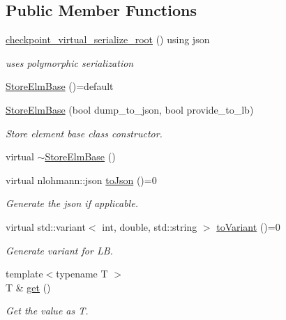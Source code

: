 \subsection*{Public Member Functions}
\begin{DoxyCompactItemize}
\item 
\hyperlink{structvt_1_1vrt_1_1collection_1_1storage_1_1_store_elm_base_ace4bb0073e5de18f3743ca10c31fdf2d}{checkpoint\+\_\+virtual\+\_\+serialize\+\_\+root} () using json
\begin{DoxyCompactList}\small\item\em uses polymorphic serialization \end{DoxyCompactList}\item 
\hyperlink{structvt_1_1vrt_1_1collection_1_1storage_1_1_store_elm_base_a7fa798418159b33d18f1b4a687c727c1}{Store\+Elm\+Base} ()=default
\item 
\hyperlink{structvt_1_1vrt_1_1collection_1_1storage_1_1_store_elm_base_a8deb42154070f2636df8f6fecdd6430c}{Store\+Elm\+Base} (bool dump\+\_\+to\+\_\+json, bool provide\+\_\+to\+\_\+lb)
\begin{DoxyCompactList}\small\item\em Store element base class constructor. \end{DoxyCompactList}\item 
virtual \hyperlink{structvt_1_1vrt_1_1collection_1_1storage_1_1_store_elm_base_a564f20122fff98f72f65752ce610f05e}{$\sim$\+Store\+Elm\+Base} ()
\item 
virtual nlohmann\+::json \hyperlink{structvt_1_1vrt_1_1collection_1_1storage_1_1_store_elm_base_a3c207bb3612dba2db9fef7e0e7f2e717}{to\+Json} ()=0
\begin{DoxyCompactList}\small\item\em Generate the json if applicable. \end{DoxyCompactList}\item 
virtual std\+::variant$<$ int, double, std\+::string $>$ \hyperlink{structvt_1_1vrt_1_1collection_1_1storage_1_1_store_elm_base_a1cfa9cc885ea3f22678b80701498c0ff}{to\+Variant} ()=0
\begin{DoxyCompactList}\small\item\em Generate variant for LB. \end{DoxyCompactList}\item 
{\footnotesize template$<$typename T $>$ }\\T \& \hyperlink{structvt_1_1vrt_1_1collection_1_1storage_1_1_store_elm_base_aa20aab1f18c5c993151f556d03296441}{get} ()
\begin{DoxyCompactList}\small\item\em Get the value as {\ttfamily T}. \end{DoxyCompactList}\item 

\end{DoxyCompactItemize}
